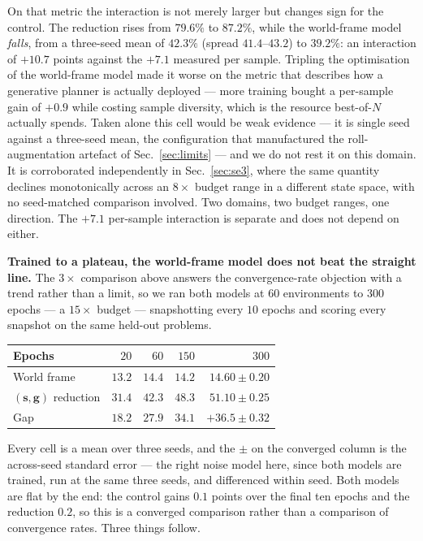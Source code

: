 \documentclass[10pt,twocolumn,letterpaper]{article}
\newcommand{\toprule}{\hline}
\newcommand{\midrule}{\hline}
\newcommand{\bottomrule}{\hline}
\theoremstyle{plain}
\newcommand{\svec}{\mathbf{s}}
\newcommand{\gvec}{\mathbf{g}}
\begin{document}
On that metric the interaction is not merely larger but changes sign for the
control. The reduction rises from $79.6\%$ to $87.2\%$, while the world-frame model
\emph{falls}, from a three-seed mean of $42.3\%$ (spread $41.4$--$43.2$) to
$39.2\%$: an interaction of $+10.7$ points against the $+7.1$ measured per
sample. Tripling the optimisation of the world-frame model made it worse on the
metric that describes how a generative planner is actually deployed --- more
training bought a per-sample gain of $+0.9$ while costing sample diversity, which
is the resource best-of-$N$ actually spends. Taken alone this cell would be weak
evidence --- it is single seed against a three-seed mean, the configuration that
manufactured the roll-augmentation artefact of Sec.~\ref{sec:limits} --- and we
do not rest it on this domain. It is corroborated independently in
Sec.~\ref{sec:se3}, where the same quantity declines monotonically across an
$8\times$ budget range in a different state space, with no seed-matched
comparison involved. Two domains, two budget ranges, one direction. The $+7.1$
per-sample interaction is separate and does not depend on either.

\textbf{Trained to a plateau, the world-frame model does not beat the straight
line.} The $3\times$ comparison above answers the convergence-rate objection with
a trend rather than a limit, so we ran both models at $60$ environments to $300$
epochs --- a $15\times$ budget --- snapshotting every $10$ epochs and scoring
every snapshot on the same held-out problems.

\begin{center}\footnotesize\setlength{\tabcolsep}{3.5pt}
\begin{tabular}{@{}l r r r r@{}}
\toprule
Epochs & $20$ & $60$ & $150$ & $300$ \\
\midrule
World frame               & $13.2$ & $14.4$ & $14.2$ & $14.60\pm0.20$ \\
$(\svec,\gvec)$ reduction & $31.4$ & $42.3$ & $48.3$ & $\mathbf{51.10\pm0.25}$ \\
\midrule
Gap                       & $18.2$ & $27.9$ & $34.1$ & $\mathbf{+36.5\pm0.32}$ \\
\bottomrule
\end{tabular}
\end{center}

Every cell is a mean over three seeds, and the $\pm$ on the converged column is
the across-seed standard error --- the right noise model here, since both models
are trained, run at the same three seeds, and differenced within seed. Both models
are flat by the end: the control gains $0.1$ points over the final ten epochs and
the reduction $0.2$, so this is a converged comparison rather than a comparison
of convergence rates.
Three things follow.
\end{document}

